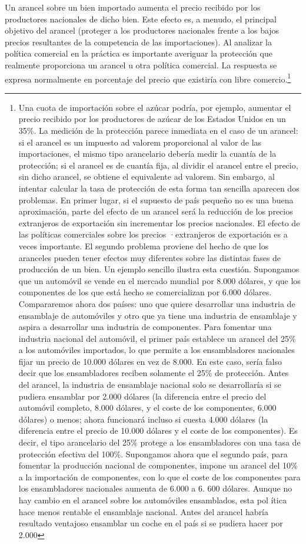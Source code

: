 \documentclass[10pt,a4paper]{article}
\begin{document}
Un arancel sobre un bien importado aumenta el precio recibido por los productores nacionales de dicho bien. Este efecto es, a menudo, el principal objetivo del arancel (proteger a los productores nacionales frente a los bajos precios resultantes de la competencia de las importaciones). Al analizar la política comercial en la práctica es importante averiguar la protección que realmente proporciona un arancel u otra política comercial. La respuesta se expresa normalmente en porcentaje del precio que existiría con libre comercio.\footnote{%
    Una cuota de importación sobre el azúcar podría, por ejemplo, aumentar el precio recibido por los productores de azúcar de los Estados Unidos en un 35\%. La medición de la protección parece inmediata en el caso de un arancel: si el arancel es un impuesto ad valorem proporcional al valor de las importaciones, el mismo tipo arancelario debería medir la cuantía de la protección; si el arancel es de cuantía fija, al dividir el arancel entre el precio, sin dicho arancel, se obtiene el equivalente ad valorem. Sin embargo, al intentar calcular la tasa de protección de esta forma tan sencilla aparecen dos problemas. En primer lugar, si el supuesto de país pequeño no es una buena aproximación, parte del efecto de un arancel será la reducción de los precios extranjeros de exportación sin incrementar los precios nacionales. El efecto de las políticas comerciales sobre los precios ·extranjeros de exportación es a veces importante. El segundo problema proviene del hecho de que los aranceles pueden tener efectos muy diferentes sobre las distintas fases de producción de un bien. Un ejemplo sencillo ilustra esta cuestión. Supongamos que un automóvil se vende en el mercado mundial por 8.000 dólares, y que los componentes de los que está hecho se comercializan por 6.000 dólares. Compararemos ahora dos países: uno que quiere desarrollar una industria de ensamblaje de automóviles y otro que ya tiene una industria de ensamblaje y aspira a desarrollar una industria de componentes. Para fomentar una industria nacional del automóvil, el primer país establece un arancel del 25\% a los automóviles importados, lo que permite a los ensambladores nacionales fijar un precio de 10.000 dólares en vez de 8.000. En este caso, sería falso decir que los ensambladores reciben solamente el 25\% de protección. Antes del arancel, la industria de ensamblaje nacional solo se desarrollaría si se pudiera ensamblar por 2.000 dólares (la diferencia entre el precio del automóvil completo, 8.000 dólares, y el coste de los componentes, 6.000 dólares) o menos; ahora funcionará incluso si cuesta 4.000 dólares (la diferencia entre el precio de 10.000 dólares y el coste de los componentes). Es decir, el tipo arancelario del 25\% protege a los ensambladores con una tasa de protección efectiva del 100\%. Supongamos ahora que el segundo país, para fomentar la producción nacional de componentes, impone un arancel del 10\% a la importación de componentes, con lo que el coste de los componentes para los ensambladores nacionales aumenta de 6.000 a 6. 600 dólares. Aunque no hay cambio en el arancel sobre los automóviles ensamblados, esta pol ítica hace menos rentable el ensamblaje nacional. Antes del arancel habría resultado ventajoso ensamblar un coche en el país si se pudiera hacer por 2.000 }
\end{document}
